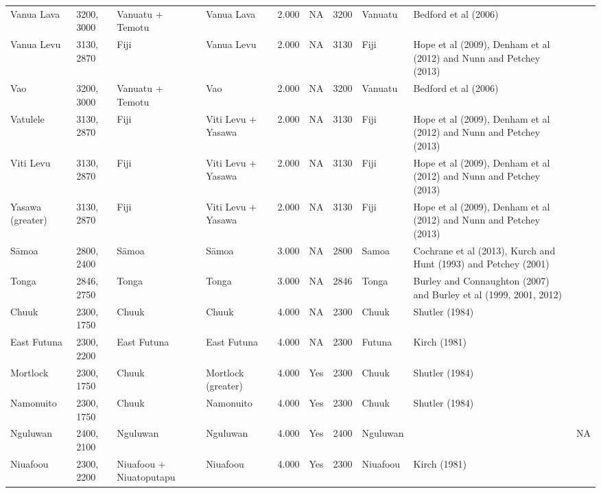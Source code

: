 \begin{longtable}{p{4.5cm}p{2cm}p{2cm}p{2cm}p{4cm}p{4cm}p{4cm}p{4cm}p{4cm}p{4cm}}
  Vanua Lava & 3200, 3000 & Vanuatu + Temotu & Vanua Lava & 2.000 & NA & 3200 & Vanuatu & Bedford et al (2006) & \citet{rieth_cochrane_2018} \\ 
  Vanua Levu & 3130, 2870 & Fiji & Vanua Levu & 2.000 & NA & 3130 & Fiji & Hope et al (2009), Denham et al (2012) and Nunn and Petchey (2013) & \citet{rieth_cochrane_2018} \\ 
  Vao & 3200, 3000 & Vanuatu + Temotu & Vao & 2.000 & NA & 3200 & Vanuatu & Bedford et al (2006) & \citet{rieth_cochrane_2018} \\ 
  Vatulele & 3130, 2870 & Fiji & Viti Levu + Yasawa & 2.000 & NA & 3130 & Fiji & Hope et al (2009), Denham et al (2012) and Nunn and Petchey (2013) & \citet{rieth_cochrane_2018} \\ 
  Viti Levu & 3130, 2870 & Fiji & Viti Levu + Yasawa & 2.000 & NA & 3130 & Fiji & Hope et al (2009), Denham et al (2012) and Nunn and Petchey (2013) & \citet{rieth_cochrane_2018} \\ 
  Yasawa (greater) & 3130, 2870 & Fiji & Viti Levu + Yasawa & 2.000 & NA & 3130 & Fiji & Hope et al (2009), Denham et al (2012) and Nunn and Petchey (2013) & \citet{rieth_cochrane_2018} \\ 
  Sāmoa & 2800, 2400 & Sāmoa & Sāmoa & 3.000 & NA & 2800 & Samoa & Cochrane et al (2013), Kurch and Hunt (1993) and Petchey (2001) & \citet{rieth_cochrane_2018} \\ 
  Tonga & 2846, 2750 & Tonga & Tonga & 3.000 & NA & 2846 & Tonga & Burley and Connaughton (2007) and Burley et al (1999, 2001, 2012) & \citet{rieth_cochrane_2018} \\ 
  Chuuk & 2300, 1750 & Chuuk & Chuuk & 4.000 & NA & 2300 & Chuuk & Shutler (1984) & \citet{rieth_cochrane_2018} \\ 
  East Futuna & 2300, 2200 & East Futuna & East Futuna & 4.000 & NA & 2300 & Futuna & Kirch (1981) & \citet{rieth_cochrane_2018} \\ 
  Mortlock & 2300, 1750 & Chuuk & Mortlock (greater) & 4.000 & Yes & 2300 & Chuuk & Shutler (1984) & \citet{rieth_cochrane_2018} \\ 
  Namonuito & 2300, 1750 & Chuuk & Namonuito & 4.000 & Yes & 2300 & Chuuk & Shutler (1984) & \citet{rieth_cochrane_2018} \\ 
  Nguluwan & 2400, 2100 & Nguluwan & Nguluwan & 4.000 & Yes & 2400 & Nguluwan & \citet{Napolitano_et_al_yap} & NA \\ 
  Niuafoou & 2300, 2200 & Niuafoou + Niuatoputapu & Niuafoou & 4.000 & Yes & 2300 & Niuafoou & Kirch (1981) & \citet{rieth_cochrane_2018} \\ 

\end{longtable}
